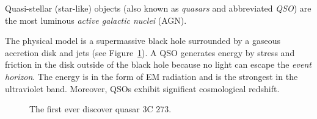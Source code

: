 Quasi-stellar (star-like) objects (also known as \textit{quasars} and abbreviated \textit{QSO}) are the most luminous \textit{active galactic nuclei} (AGN).~\cite{beckmann2013}

The physical model is a supermassive black hole surrounded by a gaseous accretion disk and jets (see Figure~\ref{3c_273}).
A QSO generates energy by stress and friction in the disk outside of the black hole because no light can escape the \textit{event horizon}.
The energy is in the form of EM radiation and is the strongest in the ultraviolet band.
Moreover, QSOs exhibit significat cosmological redshift.

\begin{figure}
\begin{center}
\end{center}
\caption{
The first ever discover quasar 3C 273.
}
\label{3c_273}
\end{figure}

